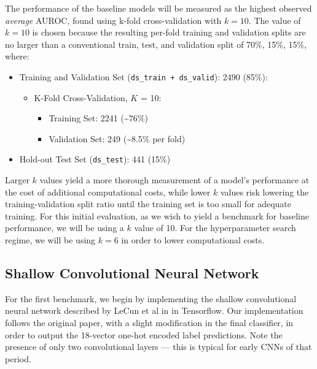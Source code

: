 The performance of the baseline models will be measured as the highest observed \emph{average} AUROC, found using k-fold cross-validation with \(k=10\). The value of \(k=10\) is chosen because the resulting per-fold training and validation splits are no larger than a conventional train, test, and validation split of 70\%, 15\%, 15\%, where:

\begin{itemize}
    \item Training and Validation Set (\texttt{ds\_train + ds\_valid}): 2490 (85\%):
    \begin{itemize}
        \item K-Fold Cross-Validation, $K$ = 10:
        \begin{itemize}
            \item Training Set: 2241 (\textasciitilde76\%)
            \item Validation Set: 249 (\textasciitilde8.5\% per fold)
        \end{itemize}
    \end{itemize}
    \item Hold-out Test Set (\texttt{ds\_test}): 441 (15\%)
\end{itemize}

\noindent
Larger \(k\) values yield a more thorough measurement of a model's performance at the cost of additional computational costs, while lower \(k\) values risk lowering the training-validation split ratio until the training set is too small for adequate training. For this initial evaluation, as we wish to yield a benchmark for baseline performance, we will be using a \(k\) value of 10. For the hyperparameter search regime, we will be using \(k=6\) in order to lower computational costs.

\subsection{Shallow Convolutional Neural Network}

For the first benchmark, we begin by implementing the shallow convolutional neural network described by LeCun et al in \autocite{lenet1998} in Tensorflow. Our implementation follows the original paper, with a slight modification in the final classifier, in order to output the 18-vector one-hot encoded label predictions. Note the presence of only two convolutional layers --- this is typical for early CNNs of that period.



